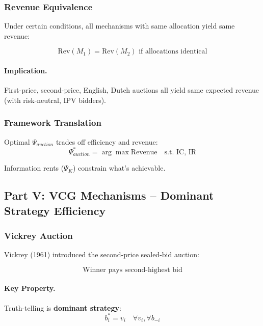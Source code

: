 \subsubsection{Revenue Equivalence}

Under certain conditions, all mechanisms with same allocation yield same revenue:

\begin{equation}
\boxed{
\text{Rev}(M_1) = \text{Rev}(M_2) \text{ if allocations identical}
}
\label{eq:revenue-equivalence}
\end{equation}

\paragraph{Implication.}
First-price, second-price, English, Dutch auctions all yield same expected 
revenue (with risk-neutral, IPV bidders).

\subsubsection{Framework Translation}

Optimal $\Psi_{auction}$ trades off efficiency and revenue:
\begin{equation}
\Psi^*_{auction} = \arg\max \text{Revenue} \quad \text{s.t. IC, IR}
\end{equation}

Information rents ($\Psi_K$) constrain what's achievable.

\subsection{Part V: VCG Mechanisms – Dominant Strategy Efficiency}

\subsubsection{Vickrey Auction}

Vickrey (1961) introduced the second-price sealed-bid auction:

\begin{equation}
\boxed{
\text{Winner pays second-highest bid}
}
\label{eq:vickrey}
\end{equation}

\paragraph{Key Property.}
Truth-telling is \textbf{dominant strategy}:
\begin{equation}
b_i^* = v_i \quad \forall v_i, \forall b_{-i}
\end{equation}


